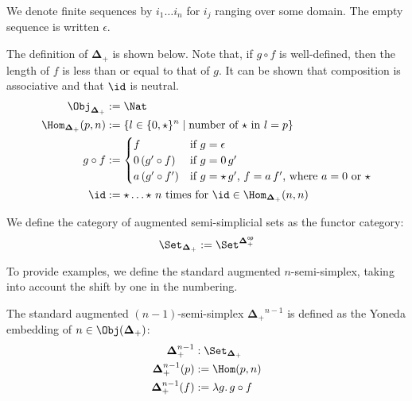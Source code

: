 \documentclass{art.cls/art}
\newcommand{\DeltaPlus}{\ensuremath{\boldsymbol{\Delta}_+}}
\newcommand{\kstar}{{\star}}
\begin{document}
\begin{notation}
  We denote finite sequences by $i_1 \ldots i_n$ for $i_j$ ranging over some domain. The empty sequence is written $\epsilon$.
\end{notation}

\begin{definition}[$\DeltaPlus$]
  The definition of $\DeltaPlus$ is shown below. Note that, if $g \circ f$ is well-defined, then the length of $f$ is less than or equal to that of $g$. It can be shown that composition is associative and that $\id$ is neutral.
  \begin{align*}
    \Obj_{\DeltaPlus}       & := \Nat                                                                         \\
    \Hom_{\DeltaPlus}(p, n) & := \{l \in \{0, \kstar\}^n \mid \text{number of $\kstar$ in $l = p$}\}          \\
    g \circ f               & :=
    \begin{cases}
      f                & \text{if $g = \epsilon$}                                           \\
      0\,(g' \circ f)  & \text{if $g = 0\,g'$}                                              \\
      a\,(g' \circ f') & \text{if $g = \kstar\,g'$, $f = a\,f'$, where $a = 0$ or $\kstar$} \\
    \end{cases}                     \\
    \id                     & := \kstar \ldots \kstar \text{ $n$ times for $\id \in \Hom_{\DeltaPlus}(n, n)$}
  \end{align*}
\end{definition}

\begin{definition}[$\Set_{\DeltaPlus}$]
  We define the category of augmented semi-simplicial sets as the functor category:
  \begin{equation*}
    \Set_{\DeltaPlus} := \Set^{\DeltaPlus^{\mathsf{op}}}
  \end{equation*}
\end{definition}

To provide examples, we define the standard augmented $n$-semi-simplex, taking into account the shift by one in the numbering.

\begin{definition}[$\DeltaPlus^n$]
  The standard augmented $(n-1)$-semi-simplex $\DeltaPlus^{n-1}$ is defined as the Yoneda embedding of $n \in \Obj(\DeltaPlus)$:
  \begin{align*}
    \DeltaPlus^{n-1}    & : \Set_{\DeltaPlus}        \\
    \DeltaPlus^{n-1}(p) & := \Hom(p, n)              \\
    \DeltaPlus^{n-1}(f) & := \lambda g .\, g \circ f
  \end{align*}
\end{definition}
\end{document}
